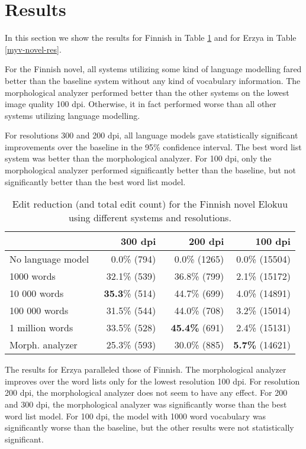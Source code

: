 \documentclass[b5paper]{article}
\begin{document}
\section{Results}
\label{res}
In this section we show the results for Finnish in Table
\ref{fin-novel-res} and for Erzya in Table
\ref{myv-novel-res}. 

For the Finnish novel, all systems utilizing some kind of language
modelling fared better than the baseline system without any kind of
vocabulary information. The morphological analyzer performed better
than the other systems on the lowest image quality 100 dpi. Otherwise,
it in fact performed worse than all other systems utilizing language
modelling.

For resolutions 300 and 200 dpi, all language models gave
statistically significant improvements over the baseline in the 95\%
confidence interval. The best word list system was better than the
morphological analyzer. For 100 dpi, only the morphological analyzer
performed significantly better than the baseline, but not
significantly better than the best word list model.

\begin{table}[!htb]
\begin{center}
\begin{tabular}{lrrr}
\hline 
                  & 300 dpi & 200 dpi & 100 dpi \\
\hline 
No language model & ~0.0\% (794)          & ~0.0\% (1265)          & 0.0\% (15504)  \\
1000 words        & ~32.1\% (539)  & ~36.8\% (799)        & 2.1\% (15172)           \\
10 000 words      & {\bf ~35.3}\% (514)  & ~44.7\%  (699)  & 4.0\% (14891)          \\
100 000 words     & ~31.5\% (544)   & ~44.0\%  (708)  & 3.2\%  (15014)              \\
1 million words   & ~33.5\% (528)   & {\bf ~45.4\%} (691)  & 2.4\% (15131)          \\
Morph. analyzer   & ~25.3\% (593)    & ~30.0\% (885)     & {\bf 5.7\%} (14621)      \\
\hline 
\end{tabular}
\caption{Edit reduction (and total edit count) for the Finnish novel Elokuu using different systems and resolutions.}\label{fin-novel-res}
\end{center}
\end{table}

The results for Erzya paralleled those of Finnish. The morphological
analyzer improves over the word lists only for the lowest resolution
100 dpi. For resolution 200 dpi, the morphological analyzer does not
seem to have any effect. For 200 and 300 dpi, the morphological
analyzer was significantly worse than the best word list model. For
100 dpi, the model with 1000 word vocabulary was significantly worse
than the baseline, but the other results were not statistically
significant.
\end{document}
